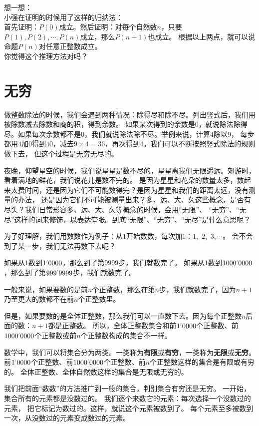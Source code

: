 \documentclass[12pt,UTF8,fontset=none]{ctexbook}
\begin{document}
\begin{sk}\label{sk:2-2-1}
    想一想：\\
    小强在证明的时候用了这样的归纳法：\\
    首先证明：$P(0)$成立。然后证明：对每个自然数$n$，只要$P(1), P(2), \cdots , P(n)$成立，那么$P(n+1)$也成立。
    根据以上两点，就可以说命题$P(n)$对任意正整数成立。\\
    你觉得这个推理方法对吗？
\end{sk}

\section{无穷}
做整数除法的时候，我们会遇到两种情况：除得尽和除不尽。列出竖式后，我们用被除数减去除数和商的积，得到余数。
如果某次得到的余数是$0$，就说除法除得尽。如果每次余数都不是$0$，我们就说除法除不尽。举例来说，计算$4$除以$9$，
每步都用$4$加$0$得到$40$，减去$9\times 4=36$，再次得到$4$。我们可以不断按照竖式除法的规则做下去，
但这个过程是无穷无尽的。

夜晚，仰望星空的时候，我们说星星是数不尽的，星星离我们无限遥远。郊游时，看着满地的鲜花，我们说花儿是数不完的。
是因为星星和花朵的数量太多，数起来太费时间，还是因为它们不可能数得完？是因为星星和我们的距离太远，没有测量的办法，
还是因为它们不可能被测量出来？多、远、大、久这些概念，是否有尽头？我们日常形容多、远、大、久等概念的时候，会用“无限”、
“无穷”、“无尽”这样的词来修饰，以表达夸张。到底“无限”、“无穷”、“无尽”是什么意思呢？

为了好理解，我们用数数作为例子：从$1$开始数数，每次加$1$：$1,\,\,2,\,\,3,\cdots$。
会不会到了某一步，我们无法再数下去呢？

如果从$1$数到$1\dlim{0000}$，那么到了第$9999$步，我们就数完了。
如果从$1$数到$1000\dlim{0000}$，那么到了第$999\dlim{9999}$步，我们就数完了。

一般来说，如果要数的是前$n$个正整数，那么在第$n$步，我们就数完了，因为$n+1$乃至更大的数都不在前$n$个正整数里。

但是，如果要数的是全体正整数，那么我们可以一直数下去。因为每个正整数$n$后面的数：$n+1$都是正整数。
所以，全体正整数集合和前$1\dlim{0000}$个正整数、前$1000\dlim{0000}$个正整数或前$n$个正整数构成的集合不一样。

数学中，我们可以将集合分为两类。一类称为\textbf{有限}或\textbf{有穷}，一类称为\textbf{无限}或\textbf{无穷}。
前$1\dlim{0000}$个正整数、前$1000\dlim{0000}$个正整数、前$n$个正整数这样的集合是有限或有穷的。
全体正整数、全体自然数这样的集合是无限或无穷的。

我们把前面“数数”的方法推广到一般的集合，判别集合有穷还是无穷。
一开始，集合所有的元素都是没数过的。
我们逐个来数它的元素：每次选择一个没数过的元素，
把它标记为数过的。这样，就说这个元素被数到了。
每个元素至多被数到一次，从没数过的元素变成数过的元素。
\end{document}
